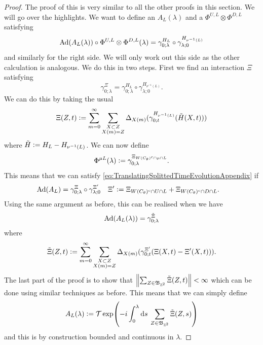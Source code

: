 \documentclass[12pt,a4paper,twoside]{article}
\numberwithin{equation}{section}
\begin{document}
\begin{proof}
	The proof of this is very similar to all the other proofs in this section. We will go over the highlights. We want to define an $A_L(\lambda)$ and a $\Phi^{U,L}\otimes\Phi^{D,L}$ satisfying
	\begin{equation}
		\Ad{A_L(\lambda)}\circ\Phi^{U,L}\otimes\Phi^{D,L}(\lambda)=\gamma^{H_L}_{0;\lambda}\circ\gamma^{H_{\nu^{-1}(L)}}_{\lambda;0}
	\end{equation}
	and similarly for the right side. We will only work out this side as the other calculation is analogous. We do this in two steps. First we find an interaction $\Xi$ satisfying
	\begin{equation}
		\gamma^\Xi_{0;\lambda}=\gamma^{H_L}_{0;\lambda}\circ\gamma^{H_{\nu^{-1}(L)}}_{\lambda;0}.
	\end{equation}
	We can do this by taking the usual
	\begin{equation}
		\Xi(Z,t)\vcentcolon= \sum_{m=0}^{\infty}\sum_{\substack{X\subset Z\\X(m)=Z}}\Delta_{X(m)}(\gamma^{H_{\nu^{-1}(L)}}_{0;t}(\tilde{H}(X,t)))
	\end{equation}
	where $\tilde{H}\vcentcolon= H_L-H_{\nu^{-1}(L)}$. We can now define
	\begin{equation}
		\Phi^{\mu L}(\lambda)\vcentcolon=\gamma^{\Xi_{W(C_\theta)^c\cap\mu\cap L}}_{0;\lambda}.
	\end{equation}
	This means that we can satisfy \ref{eq:TranslatingSplittedTimeEvolutionAppendix} if
	\begin{align}
		\Ad{A_L}&=\gamma^{\Xi}_{0;\lambda}\circ\gamma^{\Xi'}_{\lambda;0}&\Xi'&\defeq \Xi_{W(C_\theta)^c\cap U\cap L}+\Xi_{W(C_\theta)^c\cap D\cap L}.
	\end{align}
	Using the same argument as before, this can be realised when we have
	\begin{equation}
		\Ad{A_L(\lambda)}=\gamma^{\tilde\Xi}_{0;\lambda}
	\end{equation}
	where
	\begin{equation}
		\tilde\Xi(Z,t)\vcentcolon= \sum_{m=0}^{\infty}\sum_{\substack{X\subset Z\\X(m)=Z}}\Delta_{X(m)}(\gamma^{\Xi'}_{0;t}(\Xi(X,t)-\Xi'(X,t))).
	\end{equation}
	The last part of the proof is to show that $\norm{\sum_{Z\in\mathfrak{B}_{\mathbb Z^2}}\tilde\Xi(Z,t)}<\infty$ which can be done using similar techniques as before. This means that we can simply define
	\begin{equation}
		A_L(\lambda)\vcentcolon=\mathcal{T}\exp(-i\int_0^\lambda \text{d} s\: \sum_{Z\in \mathfrak{B}_{\mathbb Z^2}}\tilde{\Xi}(Z,s))
	\end{equation}
	and this is by construction bounded and continuous in $\lambda$.
\end{proof}
\clearpage


\end{document}
